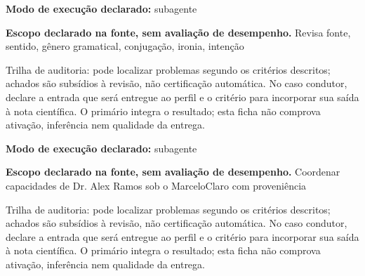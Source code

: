 \begin{arquitetura}
\textbf{Modo de execução declarado:} subagente
\end{arquitetura}


\begin{descricao}
\textbf{Escopo declarado na fonte, sem avaliação de desempenho.}
Revisa fonte, sentido, gênero gramatical, conjugação, ironia, intenção
\end{descricao}

\begin{funcao}
Trilha de auditoria: pode localizar problemas segundo os critérios descritos; achados são subsídios à revisão, não certificação automática. No caso condutor, declare a entrada que será entregue ao perfil e o critério para incorporar sua saída à nota científica. O primário integra o resultado; esta ficha não comprova ativação, inferência nem qualidade da entrega.
\end{funcao}

\begin{arquitetura}
\textbf{Modo de execução declarado:} subagente
\end{arquitetura}


\begin{descricao}
\textbf{Escopo declarado na fonte, sem avaliação de desempenho.}
Coordenar capacidades de Dr. Alex Ramos sob o MarceloClaro com proveniência
\end{descricao}

\begin{funcao}
Trilha de auditoria: pode localizar problemas segundo os critérios descritos; achados são subsídios à revisão, não certificação automática. No caso condutor, declare a entrada que será entregue ao perfil e o critério para incorporar sua saída à nota científica. O primário integra o resultado; esta ficha não comprova ativação, inferência nem qualidade da entrega.
\end{funcao}

